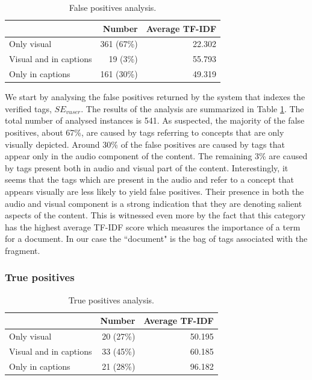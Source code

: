 \begin{table}[tb]
\centering
\begin{footnotesize}
\begin{tabular}{l|r|r}
\toprule
 & Number & Average TF-IDF\\
 \hline
Only visual & 361 (67\%)& 22.302\\
\hline
Visual and in captions & 19 (3\%)& 55.793\\
\hline
Only in captions  & 161 (30\%)& 49.319\\
\bottomrule
\end{tabular}
\caption{False positives analysis.}
\label{topicir:table:false-pos}
\end{footnotesize}
\end{table}

We start by analysing the false positives returned by the system that indexes the verified tags, $SE_{vuser}$.  The results of the analysis are summarized in Table \ref{topicir:table:false-pos}. The total number of analysed instances is 541. As suspected, the majority of the false positives, about 67\%, are caused by tags referring to concepts that are only visually depicted. Around 30\% of the false positives are caused by tags that appear only in the audio component of the content. The remaining 3\% are caused by tags present both in audio and visual part of the content. Interestingly, it seems that the tags which are present in the audio and refer to a concept that appears visually are less likely to yield false positives. Their presence in both the audio and visual component is a strong indication that they are denoting salient aspects of the content. This is witnessed even more by the fact that this category has the highest average TF-IDF score which measures the importance of a term for a document. In our case the ``document" is the bag of tags associated with the fragment.

\subsubsection{True positives}

\begin{table}[tb]
\centering
\begin{footnotesize}
\begin{tabular}{l|r|r}
\toprule
 & Number & Average TF-IDF\\
 \hline
Only visual & 20 (27\%)& 50.195\\
\hline
Visual and in captions& 33 (45\%)& 60.185\\
\hline
Only in captions  & 21 (28\%)& 96.182\\
\bottomrule
\end{tabular}
\caption{True positives analysis.}
\label{topicir:table:true-pos}
\end{footnotesize}
\end{table}

